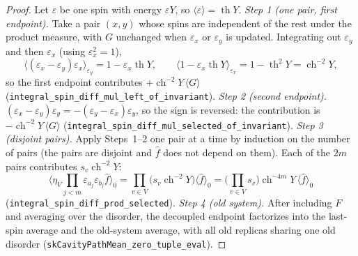 \begin{proof}
\leanok
Let $\varepsilon$ be one spin with energy $\varepsilon Y$, so $\langle\varepsilon\rangle=\operatorname{th}Y$.
\emph{Step 1 (one pair, first endpoint).} Take a pair $(x,y)$ whose spins are independent of the rest under the product measure, with $G$ unchanged when $\varepsilon_x$ or $\varepsilon_y$ is updated. Integrating out $\varepsilon_y$ and then $\varepsilon_x$ (using $\varepsilon_x^2=1$),
\[
\langle(\varepsilon_x-\varepsilon_y)\varepsilon_x\rangle_{\varepsilon_y}=1-\varepsilon_x\operatorname{th}Y,\qquad
\langle1-\varepsilon_x\operatorname{th}Y\rangle_{\varepsilon_x}=1-\operatorname{th}^2Y=\operatorname{ch}^{-2}Y,
\]
so the first endpoint contributes $+\operatorname{ch}^{-2}Y\,\langle G\rangle$ (\texttt{integral\_spin\_diff\_mul\_left\_of\_invariant}).
\emph{Step 2 (second endpoint).} $(\varepsilon_x-\varepsilon_y)\varepsilon_y=-(\varepsilon_y-\varepsilon_x)\varepsilon_y$, so the sign is reversed: the contribution is $-\operatorname{ch}^{-2}Y\,\langle G\rangle$ (\texttt{integral\_spin\_diff\_mul\_selected\_of\_invariant}).
\emph{Step 3 (disjoint pairs).} Apply Steps~1--2 one pair at a time by induction on the number of pairs (the pairs are disjoint and $\hat f$ does not depend on them). Each of the $2m$ pairs contributes $s_v\operatorname{ch}^{-2}Y$:
\[
\Big\langle\eta_V\prod_{j<m}\varepsilon_{a_j}\varepsilon_{b_j}\hat f\Big\rangle_0=\prod_{v\in V}\big(s_v\operatorname{ch}^{-2}Y\big)\langle\hat f\rangle_0=\Big(\prod_{v\in V}s_v\Big)\operatorname{ch}^{-4m}Y\,\langle\hat f\rangle_0
\]
(\texttt{integral\_spin\_diff\_prod\_selected}).
\emph{Step 4 (old system).} After including $F$ and averaging over the disorder, the decoupled endpoint factorizes into the last-spin average and the old-system average, with all old replicas sharing one old disorder (\texttt{skCavityPathMean\_zero\_tuple\_eval}).
\end{proof}

